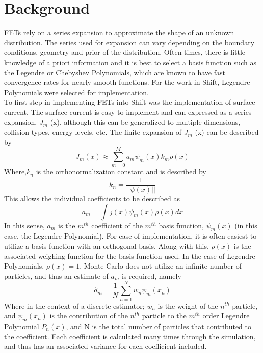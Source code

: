 \documentclass[10tma4paper]{article}
\begin{document}
\section{Background}\label{background}


FETs rely on a series expansion to approximate the shape of an unknown distribution. The series used for expansion can vary depending on the boundary conditions, geometry and prior of the distribution. Often times, there is little knowledge of a priori information and it is best to select a basis function such as the Legendre or Chebyshev Polynomials, which are known to have fast convergence rates for nearly smooth functions. For the work in Shift, Legendre Polynomials were selected for implementation.
\\
To first step in implementing FETs into Shift was the implementation of surface current. The surface current is easy to implement and can expressed as a series expansion, $J_{m}$ (x), although this can be generalized to multiple dimensions, collision types, energy levels, etc. The finite expansion of $J_{m}$ (x) can be described by
	\begin{equation} \label{eq:1}
	J_{m}(x) \approx \sum_{m=0}^{M}a_{m}\psi_{m}(x)k_{m}\rho(x)
	\end{equation}
Where,$k_{n}$ is the orthonormalization constant and is described by
\begin{equation}\label{eq:2}
k_{n} = \frac{1}{||\psi(x)||}
\end{equation} 
This allows the individual coefficients to be described as
	 \begin{equation} \label{eq:3}
	a_{m}=\int j(x)\psi_{m}(x)\rho(x)dx
	 \end{equation}
In this sense, $a_m$ is the $m^{th}$ coefficient of the $m^{th}$ basis function, $\psi_{m}(x)$ (in this case, the Legendre Polynomial). For ease of implementation, it is often easiest to utilize a basis function with an orthogonal basis. Along with this, $\rho(x)$ is the associated weighing function for the basis function used. In the case of Legendre Polynomials, $\rho(x)=1$. Monte Carlo does not utilize an infinite number of particles, and thus an estimate of $a_{m}$ is required, namely
	 \begin{equation} \label{eq:4}
	 \hat{a}_{m}=\frac{1}{N}\sum_{n=1}^{N}w_{n}\psi_{m}(x_{n})
	 \end{equation}
Where in the context of a discrete estimator; $w_{n}$ is the weight of the $n^{th}$ particle, and $\psi_{m}(x_{n})$ is the contribution of the $n^{th}$ particle to the $m^{th}$ order Legendre Polynomial $P_{n}(x)$, and N is the total number of particles that contributed to the coefficient. Each coefficient is calculated many times through the simulation, and thus has an associated variance for each coefficient included.
\end{document}
